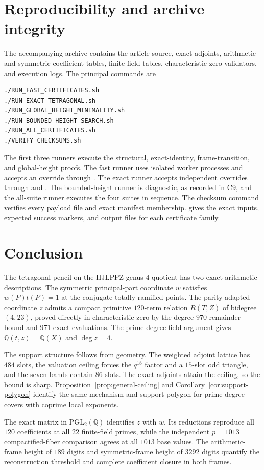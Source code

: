 \documentclass[11pt]{article}
\newcommand{\Q}{\mathbb Q}
\begin{document}
\section{Reproducibility and archive integrity}
The accompanying archive contains the article source, exact adjoints, arithmetic and symmetric coefficient tables, finite-field tables, characteristic-zero validators, and execution logs.  The principal commands are
\begin{verbatim}
./RUN_FAST_CERTIFICATES.sh
./RUN_EXACT_TETRAGONAL.sh
./RUN_GLOBAL_HEIGHT_MINIMALITY.sh
./RUN_BOUNDED_HEIGHT_SEARCH.sh
./RUN_ALL_CERTIFICATES.sh
./VERIFY_CHECKSUMS.sh
\end{verbatim}
The first three runners execute the structural, exact-identity, frame-transition, and global-height proofs.  The fast runner uses isolated worker processes and accepts an override through .  The exact runner accepts independent overrides through  and .  The bounded-height runner is diagnostic, as recorded in C9, and the all-suite runner executes the four suites in sequence.  The checksum command verifies every payload file and exact manifest membership.   gives the exact inputs, expected success markers, and output files for each certificate family.
\section{Conclusion}
The tetragonal pencil on the HJLPPZ genus-$4$ quotient has two exact arithmetic descriptions.  The symmetric principal-part coordinate $w$ satisfies $w(P)t(P)=1$ at the conjugate totally ramified points.  The parity-adapted coordinate $z$ admits a compact primitive $120$-term relation $R(T,Z)$ of bidegree $(4,23)$, proved directly in characteristic zero by the degree-$970$ remainder bound and $971$ exact evaluations.  The prime-degree field argument gives $\Q(t,z)=\Q(X)$ and $\deg z=4$.

The support structure follows from geometry.  The weighted adjoint lattice has $484$ slots, the valuation ceiling forces the $q^{18}$ factor and a $15$-slot odd triangle, and the seven bands contain $86$ slots.  The exact adjoints attain the ceiling, so the bound is sharp.  Proposition~\ref{prop:general-ceiling} and Corollary~\ref{cor:support-polygon} identify the same mechanism and support polygon for prime-degree covers with coprime local exponents.

The exact matrix in $\mathrm{PGL}_2(\Q)$ identifies $z$ with $w$.  Its reductions reproduce all $120$ coefficients at all $22$ finite-field primes, while the independent $p=1013$ compactified-fiber comparison agrees at all $1013$ base values.  The arithmetic-frame height of $189$ digits and symmetric-frame height of $3292$ digits quantify the reconstruction threshold and complete coefficient closure in both frames.
\appendix
\end{document}
